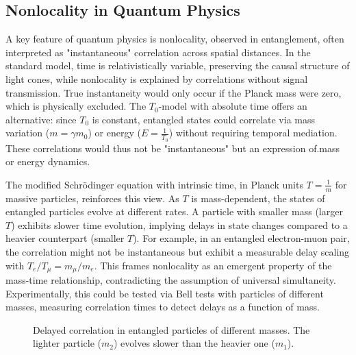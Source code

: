 \documentclass[a4paper,12pt]{article}
\begin{document}
\subsection{Nonlocality in Quantum Physics}
A key feature of quantum physics is nonlocality, observed in entanglement, often interpreted as "instantaneous" correlation across spatial distances. In the standard model, time is relativistically variable, preserving the causal structure of light cones, while nonlocality is explained by correlations without signal transmission. True instantaneity would only occur if the Planck mass were zero, which is physically excluded. The \( T_0 \)-model with absolute time offers an alternative: since \( T_0 \) is constant, entangled states could correlate via mass variation (\( m = \gamma m_0 \)) or energy (\( E = \frac{1}{T_0} \)) without requiring temporal mediation. These correlations would thus not be "instantaneous" but an expression of.mass or energy dynamics.

The modified Schrödinger equation with intrinsic time, in Planck units \( T = \frac{1}{m} \) for massive particles, reinforces this view. As \( T \) is mass-dependent, the states of entangled particles evolve at different rates. A particle with smaller mass (larger \( T \)) exhibits slower time evolution, implying delays in state changes compared to a heavier counterpart (smaller \( T \)). For example, in an entangled electron-muon pair, the correlation might not be instantaneous but exhibit a measurable delay scaling with \( T_e / T_\mu = m_\mu / m_e \). This frames nonlocality as an emergent property of the mass-time relationship, contradicting the assumption of universal simultaneity. Experimentally, this could be tested via Bell tests with particles of different masses, measuring correlation times to detect delays as a function of mass.

\begin{figure}[h]
	\centering
	\caption{Delayed correlation in entangled particles of different masses. The lighter particle ($m_2$) evolves slower than the heavier one ($m_1$).}
\end{figure}
\end{document}
